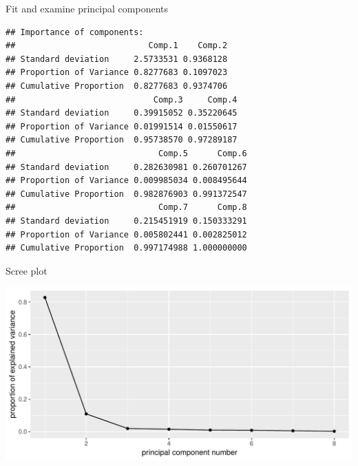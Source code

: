 \begin{frame}[fragile]{Fit and examine principal components}
 

  
{\small  
\begin{knitrout}
\color{fgcolor}\begin{kframe}
\begin{alltt}
\hlkwb{=}\hlstd{(track[,}\hlopt{:}\hlstd{],}
\end{alltt}
\begin{verbatim}
## Importance of components:
##                           Comp.1    Comp.2
## Standard deviation     2.5733531 0.9368128
## Proportion of Variance 0.8277683 0.1097023
## Cumulative Proportion  0.8277683 0.9374706
##                            Comp.3     Comp.4
## Standard deviation     0.39915052 0.35220645
## Proportion of Variance 0.01991514 0.01550617
## Cumulative Proportion  0.95738570 0.97289187
##                             Comp.5      Comp.6
## Standard deviation     0.282630981 0.260701267
## Proportion of Variance 0.009985034 0.008495644
## Cumulative Proportion  0.982876903 0.991372547
##                             Comp.7      Comp.8
## Standard deviation     0.215451919 0.150333291
## Proportion of Variance 0.005802441 0.002825012
## Cumulative Proportion  0.997174988 1.000000000
\end{verbatim}
\end{kframe}
\end{knitrout}
}

\end{frame}



  
  


\begin{frame}[fragile]{Scree plot}

\begin{knitrout}
\color{fgcolor}\begin{kframe}
\begin{alltt}
\end{alltt}
\end{kframe}
\includegraphics[width=\maxwidth]{figure/scree-b-1} 

\end{knitrout}

\end{frame}


